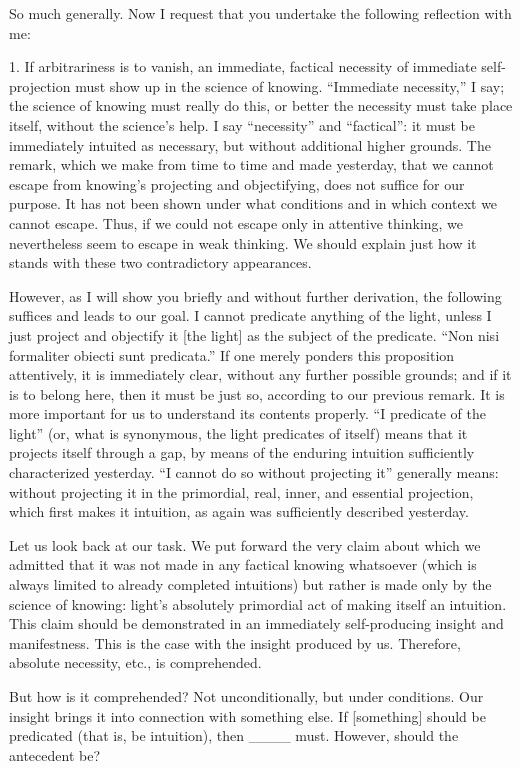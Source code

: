 So much generally.
Now I request that you undertake
the following reflection with me:

1. If arbitrariness is to vanish,
an immediate, factical necessity of
immediate self-projection must show up
in the science of knowing.
“Immediate necessity,” I say;
the science of knowing must really do this,
or better the necessity must take place itself,
without the science's help.
I say “necessity” and “factical”:
it must be immediately intuited as necessary,
but without additional higher grounds.
The remark, which we make from time to time and made yesterday,
that we cannot escape from knowing's
projecting and objectifying,
does not suffice for our purpose.
It has not been shown under what conditions and
in which context we cannot escape.
Thus, if we could not escape only in attentive thinking,
we nevertheless seem to escape in weak thinking.
We should explain just how it stands
with these two contradictory appearances.

However, as I will show you briefly
and without further derivation,
the following suffices and leads to our goal.
I cannot predicate anything of the light,
unless I just project and objectify it
[the light] as the subject of the predicate.
“Non nisi formaliter obiecti sunt predicata.”
If one merely ponders this proposition attentively,
it is immediately clear, without any further possible grounds;
and if it is to belong here, then it must be just so,
according to our previous remark.
It is more important for us to understand its contents properly.
“I predicate of the light”
(or, what is synonymous, the light predicates of itself)
means that it projects itself through a gap,
by means of the enduring intuition
sufficiently characterized yesterday.
“I cannot do so without projecting it” generally means:
without projecting it
in the primordial, real, inner, and essential projection,
which first makes it intuition,
as again was sufficiently described yesterday.

Let us look back at our task.
We put forward the very claim about which
we admitted that it was not made in any factical knowing whatsoever
(which is always limited to already completed intuitions)
but rather is made only by the science of knowing:
light's absolutely primordial act of
making itself an intuition.
This claim should be demonstrated
in an immediately self-producing insight and manifestness.
This is the case with the insight produced by us.
Therefore, absolute necessity, etc., is comprehended.

But how is it comprehended?
Not unconditionally, but under conditions.
Our insight brings it into connection with something else.
If [something] should be predicated
(that is, be intuition), then ____ must.
However, should the antecedent be?

